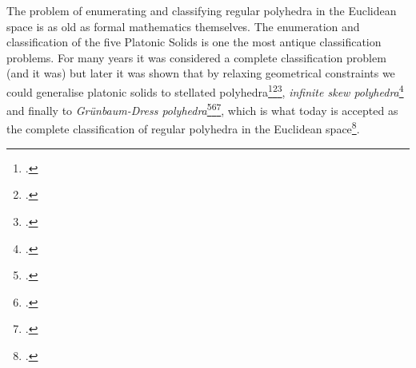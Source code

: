 The problem of enumerating and classifying regular polyhedra in the Euclidean space is as old as formal mathematics themselves.
The enumeration and classification of the five Platonic Solids is one the most antique classification problems.
For many years it was considered a complete classification problem (and it was) but later it was shown that by relaxing geometrical constraints we could generalise platonic solids to stellated polyhedra\footcite{Kepler_1864_HarmoniaMundiOpera}\footcite{Poinsot_1810_MemoireSurLes}\footcite{Cauchy_1813_AlCauchyRecherche}, \emph{infinite skew polyhedra}\footcite{Coxeter_1937_RegularSkewPolyhedra} and finally to \emph{Grünbaum-Dress polyhedra}\footcite{Gruenbaum_1977_RegularPolyhedraOld}\footcite{Dress_1981_CombinatorialTheoryGrunbaums}\footcite{Dress_1985_CombinatorialTheoryGrunbaums}, which is what today is accepted as the complete classification of regular polyhedra in the Euclidean space\footcite{McMullenSchulte_1997_RegularPolytopesOrdinary}.

